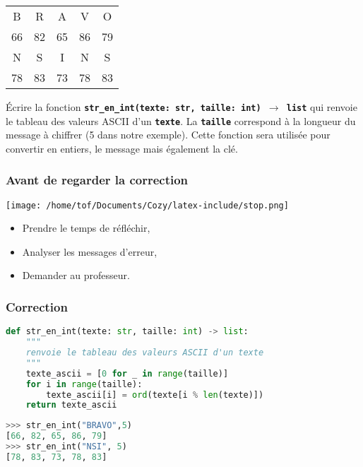 \documentclass[svgnames,11pt]{beamer}
\begin{document}
\begin{frame}
    \frametitle{}
    \begin{center}
        \begin{tabular}{*{5}{c}}
            B&R&A&V&O\\
            66&82&65&86&79\\
            N&S&I&N&S\\
            78&83&73&78&83\\
        \end{tabular}
    \end{center}
    \begin{activite}
    Écrire la fonction \textbf{\texttt{str\_en\_int(texte: str, taille: int) $\rightarrow$ list}} qui renvoie le tableau des valeurs ASCII d'un \textbf{\texttt{texte}}. La \textbf{\texttt{taille}} correspond à la longueur du message à chiffrer (5 dans notre exemple). Cette fonction sera utilisée pour convertir en entiers, le message mais également la clé.
    \end{activite}

\end{frame}
\begin{frame}
    \frametitle{Avant de regarder la correction}
\begin{center}
    \centering
    \texttt{[image: /home/tof/Documents/Cozy/latex-include/stop.png]}
    \end{center}
{\Large
    \begin{itemize}
        \item Prendre le temps de réfléchir,
        \item Analyser les messages d'erreur,
        \item Demander au professeur.
    \end{itemize}
}
\end{frame}
\begin{frame}[fragile]
    \frametitle{Correction}

\begin{center}
\begin{lstlisting}[language=Python , basicstyle=\ttfamily\small, xleftmargin=0.2em, xrightmargin=0em]
def str_en_int(texte: str, taille: int) -> list:
    """
    renvoie le tableau des valeurs ASCII d'un texte
    """
    texte_ascii = [0 for _ in range(taille)]
    for i in range(taille):
        texte_ascii[i] = ord(texte[i % len(texte)])
    return texte_ascii
\end{lstlisting}
\begin{lstlisting}[language=Python , basicstyle=\ttfamily\small, xleftmargin=0.2em, xrightmargin=0em]
>>> str_en_int("BRAVO",5)
[66, 82, 65, 86, 79]
>>> str_en_int("NSI", 5)
[78, 83, 73, 78, 83]
\end{lstlisting}
\end{center}

\end{frame}
\end{document}
